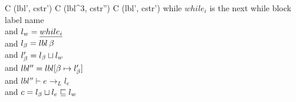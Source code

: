 \begin{trules}
        { {C} {(lbl', cstr')} }
        { {C} {(lbl^3, cstr'')} \;
          {C} {(lbl', cstr')} }
        {while $while_i$ is the next while block label name\\
          and $l_w = \underline{while_i}$\\
          and $l_\beta = lbl \, \beta$\\
          and $l_\beta' = l_\beta \sqcup l_w$\\
          and $lbl'' = lbl[\beta \mapsto l_\beta']$\\
          and $lbl'' \vdash e \rightarrow_L l_e$\\
          and $c = l_\beta \sqcup l_e \sqsubseteq l_w$}
\end{trules}


